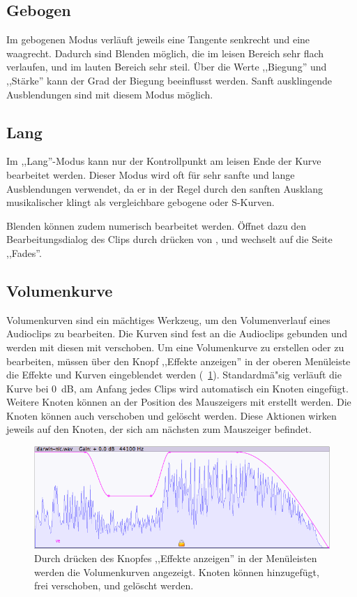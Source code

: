 \subsection{Gebogen}
Im gebogenen Modus verläuft jeweils eine Tangente senkrecht und eine waagrecht. Dadurch sind Blenden möglich, die im leisen Bereich sehr flach verlaufen, und im lauten Bereich sehr steil. Über die Werte ,,Biegung'' und ,,Stärke'' kann der Grad der Biegung beeinflusst werden. Sanft ausklingende Ausblendungen sind mit diesem Modus möglich.

\subsection{Lang}
Im ,,Lang''-Modus kann nur der Kontrollpunkt am leisen Ende der Kurve bearbeitet werden. Dieser Modus wird oft für sehr sanfte und lange Ausblendungen verwendet, da er in der Regel durch den sanften Ausklang musikalischer klingt als vergleichbare gebogene oder S-Kurven.

Blenden können zudem numerisch bearbeitet werden. Öffnet dazu den Bearbeitungsdialog des Clips durch drücken von , und wechselt auf die Seite ,,Fades''.

\subsection{Volumenkurve}
Volumenkurven sind ein mächtiges Werkzeug, um den Volumenverlauf eines Audioclips zu bearbeiten. Die Kurven sind fest an die Audioclips gebunden und werden mit diesen mit verschoben. Um eine Volumenkurve zu erstellen oder zu bearbeiten, müssen über den Knopf ,,Effekte anzeigen'' in der oberen Menüleiste die Effekte und Kurven eingeblendet werden (\FigB~\ref{fig_gcurve01}). Standardmä"sig verläuft die Kurve bei 0~dB, am Anfang jedes Clips wird automatisch ein Knoten eingefügt. Weitere Knoten können an der Position des Mauszeigers mit  erstellt werden. Die Knoten können auch verschoben  und gelöscht  werden. Diese Aktionen wirken jeweils auf den Knoten, der sich am nächsten zum Mauszeiger befindet.

\begin{figure}[t]
 \centering\includegraphics[width=\textwidth]{../images/gcurve01}
 \caption{Durch drücken des Knopfes ,,Effekte anzeigen'' in der Menüleisten werden die Volumenkurven angezeigt. Knoten können hinzugefügt, frei verschoben, und gelöscht werden.}
 \label{fig_gcurve01}
\end{figure}

